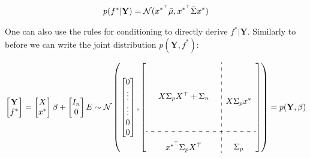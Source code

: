\begin{gather}\label{def:predictive-dist}
    p(f^{\ast} | \mathbf{Y}) = \operatorname{\mathcal{N}}(x^{\ast^{\top}} \bar{\mu}, x^{\ast^{\top}} \bar{\Sigma} x^{\ast})
\end{gather}

One can also use the rules for conditioning to directly derive $f^{\ast} | \mathbf{Y}$.
Similarly to before we can write the joint distribution $p(\mathbf{Y}, f^{\ast})$:


\begin{gather}
    \begin{bmatrix}
        \mathbf{Y} \\
        f^{\ast}
    \end{bmatrix}
    = \begin{bmatrix} X \\ x^{\ast} \end{bmatrix} \beta + \begin{bmatrix} I_n \\ 0 \end{bmatrix}  E
    \sim \N \left(
        \begin{bmatrix}
        0 \\
        \vdots \\
        \vdots \\
        0 \\
        0
        \end{bmatrix},
        \left[
        \begin{array}{ c:c c c }
            \begin{matrix}
                & & \\
                & & \\
                & & \\
                & X \Sigma_p X^{\top} + \Sigma_n & \\
                & & \\
                & & \\
                & & \\
            \end{matrix}
            & \begin{matrix} \\ \\ \\ X \Sigma_p x^{\ast} \\ \\ \\ \end{matrix} \\
            \hdashline \\
            \begin{matrix} &  x^{\ast^{\top}}  \Sigma_p X^{\top} & \end{matrix} & \Sigma_p
        \end{array}
        \right]
        \right)
    = p(\mathbf{Y}, \beta)
\end{gather}

